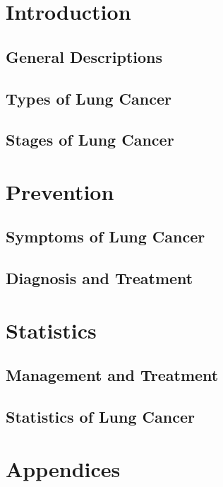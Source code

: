 


\coverpage{\TITLE}{\SUBTITLE}{\AUTHOR}{\DATE}{\SUBJECT}
\newpage
\fpage
\newpage

\tableofcontents


\part{Introduction}
\chapter{General Descriptions}


\chapter{Types of Lung Cancer}


\chapter{Stages of Lung Cancer}


\part{Prevention}
\chapter{Symptoms of Lung Cancer}


\chapter{Diagnosis and Treatment}


\part{Statistics}
\chapter{Management and Treatment}


\chapter{Statistics of Lung Cancer}


\part{Appendices}
\listoffigures
\newpage\printbibliography[title = {References}]

